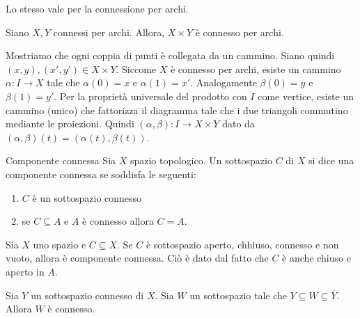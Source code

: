 \documentclass[a4paper]{article}
\begin{document}
Lo stesso vale per la connessione per archi.

\begin{snippettheorem}{}
    Siano \(X,Y\) connessi per archi.
    Allora, \(X \times Y\) è connesso per archi.
\end{snippettheorem}

\begin{snippetproof}{}
    Mostriamo che ogni coppia di punti è collegata da un cammino.
    Siano quindi \((x,y), (x',y') \in X \times Y\).
    Siccome \(X\) è connesso per archi, esiste un cammino \(\alpha\colon I \to X\)
    tale che \(\alpha(0) = x\) e \(\alpha(1) = x'\).
    Analogamente \(\beta(0) = y\) e \(\beta(1) = y'\).
    Per la proprietà universale del prodotto con \(I\) come vertice,
    esiste un cammino (unico) che fattorizza il diagramma tale che i due triangoli commutino
    mediante le proiezioni.
    Quindi \((\alpha, \beta) \colon I \to X \times Y\)
    dato da \((\alpha, \beta)(t) = (\alpha(t), \beta(t))\).
\end{snippetproof}

\begin{snippetdefinition}{Componente connessa}
    Sia \(X\) spazio topologico.
    Un sottospazio \(C\) di \(X\)
    si dice una componente connessa se soddisfa le seguenti:
    \begin{enumerate}
        \item \(C\) è un sottospazio connesso
        \item se \(C \subseteq A\) e \(A\) è connesso allora \(C=A\).
    \end{enumerate}
\end{snippetdefinition}

\begin{snippetexample}{}
    Sia \(X\) uno spazio e \(C \subseteq X\).
    Se \(C\) è sottospazio aperto, chhiuso, connesso e non vuoto, allora è componente connessa.
    Ciò è dato dal fatto che \(C\) è anche chiuso e aperto in \(A\).
\end{snippetexample}

\begin{snippetlemma}{}
    Sia \(Y\) un sottospazio connesso di \(X\).
    Sia \(W\) un sottospazio tale che \(Y \subseteq W \subseteq \overline{Y}\).
    Allora \(W\) è connesso.
\end{snippetlemma}
\end{document}
